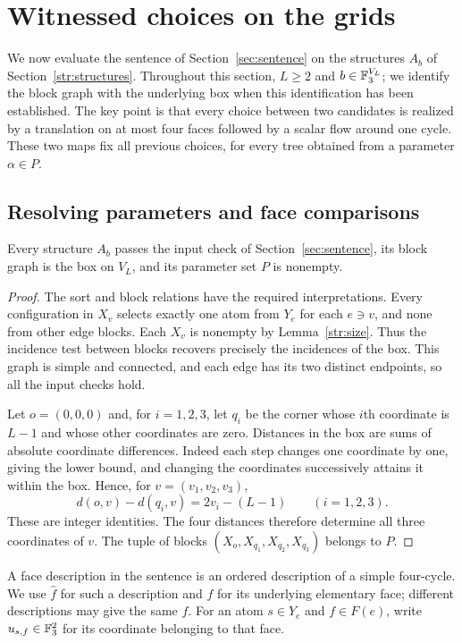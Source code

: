 \section{Witnessed choices on the grids}\label{sec:grid-behavior}\label{grid:section}

We now evaluate the sentence of Section~\ref{sec:sentence} on the
structures $A_b$ of Section~\ref{str:structures}.  Throughout this section,
$L\ge2$ and $b\in\mathbb F_3^{V_L}$; we identify the block graph with the underlying
box when this identification has been established.  The key point is that
every choice between two candidates is realized by a translation on at
most four faces followed by a scalar flow around one cycle.  These two
maps fix all previous choices, for every tree obtained from a parameter
$\alpha\in P$.

\subsection{Resolving parameters and face comparisons}

\begin{lemma}\label{grid:parameters}
Every structure $A_b$ passes the input check of Section~\ref{sec:sentence},
its block graph is the box on $V_L$, and its parameter set $P$ is nonempty.
\end{lemma}
\begin{proof}
The sort and block relations have the required interpretations.  Every
configuration in $X_v$ selects exactly one atom from $Y_e$ for each
$e\ni v$, and none from other edge blocks.  Each $X_v$ is nonempty by
Lemma~\ref{str:size}.  Thus the incidence test between blocks recovers
precisely the incidences of the box.  This graph is simple and connected,
and each edge has its two distinct endpoints, so all the input checks
hold.

Let $o=(0,0,0)$ and, for $i=1,2,3$, let $q_i$ be the corner whose $i$th
coordinate is $L-1$ and whose other coordinates are zero.  Distances in
the box are sums of absolute coordinate differences.  Indeed each step
changes one coordinate by one, giving the lower bound, and changing the
coordinates successively attains it within the box.  Hence, for
$v=(v_1,v_2,v_3)$,
\[
 d(o,v)-d(q_i,v)=2v_i-(L-1)\qquad(i=1,2,3).
\]
These are integer identities.  The four distances therefore determine
all three coordinates of $v$.  The tuple of blocks
$(X_o,X_{q_1},X_{q_2},X_{q_3})$ belongs to $P$.
\end{proof}

A face description in the sentence is an ordered description of a simple
four-cycle.  We use $\widehat f$ for such a description and $f$ for its
underlying elementary face; different descriptions may give the same
$f$.  For an atom $s\in Y_e$ and $f\in F(e)$, write $u_{s,f}\in\mathbb F_3^2$
for its coordinate belonging to that face.

